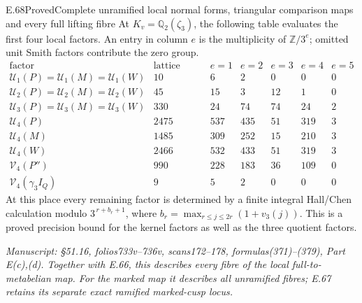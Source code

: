 \begin{statement}{E.68}{Proved}{Complete unramified local normal forms, triangular comparison maps and every full lifting fibre}
At $K_v=\mathbb Q_2(\zeta_3)$, the following table evaluates
the first four local factors. An entry in column $e$ is
the multiplicity of $\mathbb Z/3^e$; omitted unit Smith
factors contribute the zero group.
\[
\begin{array}{c|r|rrrrr}
 \text{factor}&\text{lattice rank}&e=1&e=2&e=3&e=4&e=5\\ \hline
 \mathcal U_1(P)=\mathcal U_1(M)=\mathcal U_1(W)
       &10&6&2&0&0&0\\
 \mathcal U_2(P)=\mathcal U_2(M)=\mathcal U_2(W)
       &45&15&3&12&1&0\\
 \mathcal U_3(P)=\mathcal U_3(M)=\mathcal U_3(W)
       &330&24&74&74&24&2\\
 \mathcal U_4(P)&2475&537&435&51&319&3\\
 \mathcal U_4(M)&1485&309&252&15&210&3\\
 \mathcal U_4(W)&2466&532&433&51&319&3\\
 \mathcal V_4(P'')&990&228&183&36&109&0\\
 \mathcal V_4(\gamma_3I_Q)&9&5&2&0&0&0
\end{array}
 \tag{E68.8}
\]
At this place every remaining factor is determined by a
finite integral Hall/Chen calculation modulo
$3^{\,r+b_r+1}$, where
$b_r=\max_{r\le j\le2r}(1+v_3(j))$.
This is a proved precision bound for the kernel factors
as well as the three quotient factors.

\emph{Manuscript: \S51.16, folios733v--736v, scans172--178,
formulas(371)--(379), Part E(c),(d). Together with E.66,
this describes every fibre of the local full-to-metabelian
map. For the marked map it describes all unramified fibres;
E.67 retains its separate exact ramified marked-cusp locus.}
\end{statement}

